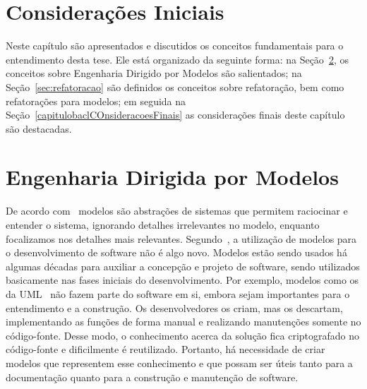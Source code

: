 
\section{Considerações Iniciais}


Neste capítulo são apresentados e discutidos os conceitos fundamentais para o entendimento desta tese. Ele está organizado da seguinte forma: na Seção~\ref{Cap2_Sec2_Desenvolvimento_Dirigido_a_Modelos}, os conceitos sobre Engenharia Dirigido por Modelos são salientados; na Seção~\ref{sec:refatoracao} são definidos os conceitos sobre refatoração, bem como refatorações para modelos; em seguida na Seção~\ref{capitulobaclCOnsideracoesFinais} as considerações finais deste capítulo são destacadas.


\section{Engenharia Dirigida por Modelos}\label{Cap2_Sec2_Desenvolvimento_Dirigido_a_Modelos}

De acordo com~ modelos são abstrações de sistemas que permitem raciocinar e entender o sistema, ignorando detalhes irrelevantes no modelo, enquanto focalizamos nos detalhes mais relevantes. Segundo~, a utilização de modelos para o desenvolvimento de software não é algo novo. Modelos estão sendo usados há algumas décadas para auxiliar a  concepção e projeto de software, sendo utilizados basicamente nas fases iniciais do desenvolvimento. Por exemplo, modelos como os da UML~\cite{UML:OMG} não fazem parte do software em si, embora sejam importantes para o entendimento e a construção. Os desenvolvedores os criam, mas os descartam, implementando as funções de forma manual e realizando manutenções somente no código-fonte. Desse modo, o conhecimento acerca da solução fica criptografado no código-fonte e dificilmente é reutilizado. Portanto, há necessidade de criar modelos que representem esse conhecimento e que possam ser úteis tanto para a documentação quanto para a construção e manutenção de software.


